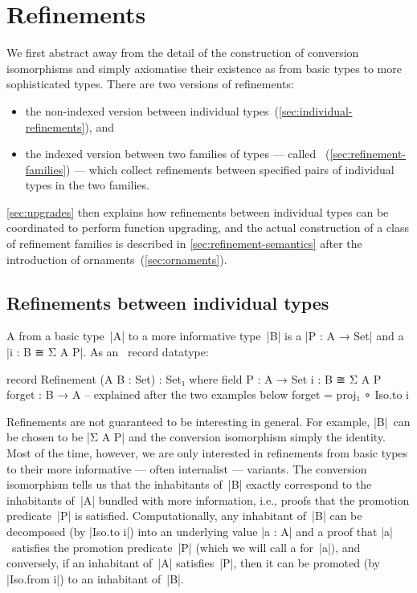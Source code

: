 \section{Refinements}
\label{sec:refinements}

We first abstract away from the detail of the construction of conversion isomorphisms and simply axiomatise their existence as  from basic types to more sophisticated types.
There are two versions of refinements:
\begin{itemize}
\item the non-indexed version between individual types~(\autoref{sec:individual-refinements}), and
\item the indexed version between two families of types --- called ~(\autoref{sec:refinement-families}) --- which collect refinements between specified pairs of individual types in the two families.
\end{itemize}
\autoref{sec:upgrades} then explains how refinements between individual types can be coordinated to perform function upgrading, and the actual construction of a class of refinement families is described in \autoref{sec:refinement-semantics} after the introduction of ornaments~(\autoref{sec:ornaments}).

\subsection{Refinements between individual types}
\label{sec:individual-refinements}

A  from a basic type~|A| to a more informative type~|B| is a  |P : A → Set| and a  |i : B ≅ Σ A P|.
As an \Agda\ record datatype:
\begin{code}
record Refinement (A B : Set) : Set₁ where
  field
    P  :  A → Set
    i  :  B ≅ Σ A P
  forget : B → A  -- explained after the two examples below
  forget = proj₁ ∘ Iso.to i
\end{code}
Refinements are not guaranteed to be interesting in general.
For example, |B|~can be chosen to be |Σ A P| and the conversion isomorphism simply the identity.
Most of the time, however, we are only interested in refinements from basic types to their more informative --- often internalist --- variants.
The conversion isomorphism tells us that the inhabitants of~|B| exactly correspond to the inhabitants of~|A| bundled with more information, i.e., proofs that the promotion predicate~|P| is satisfied.
Computationally, any inhabitant of~|B| can be decomposed (by |Iso.to i|\kern1pt) into an underlying value |a : A| and a proof that |a|~satisfies the promotion predicate~|P| (which we will call a  for~|a|), and conversely, if an inhabitant of~|A| satisfies~|P|, then it can be promoted (by |Iso.from i|\kern1pt) to an inhabitant of~|B|.

